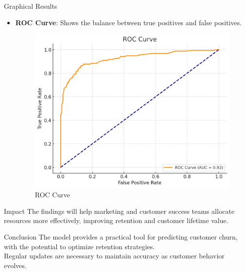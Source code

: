 \documentclass{beamer}
\begin{document}
\begin{frame}{Graphical Results}
    \begin{itemize}
        \item \textbf{ROC Curve}: Shows the balance between true positives and false positives.
        \begin{figure}[h]
            \centering
            \includegraphics[width=0.8\linewidth]{Shirshov-Step-3-fig.png}
            \caption{ROC Curve}
        \end{figure}
    \end{itemize}
\end{frame}

\begin{frame}{Impact}
    The findings will help marketing and customer success teams allocate resources more effectively, improving retention and customer lifetime value.
\end{frame}

\begin{frame}{Conclusion}
    The model provides a practical tool for predicting customer churn, with the potential to optimize retention strategies. \\ Regular updates are necessary to maintain accuracy as customer behavior evolves.
\end{frame}
\end{document}
